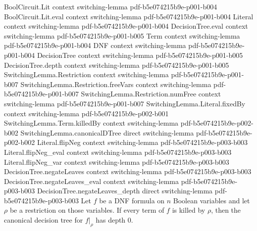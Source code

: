 \begin{lemma}
\label{SwitchingLemma.canonicalDTree_depth_zero_of_killed}
\leanok
{}
\proofstep
  {BoolCircuit.Lit}
  {context}
  {switching-lemma}
  {pdf-b5e074215b9e-p001-b004}
\proofstep
  {BoolCircuit.Lit.eval}
  {context}
  {switching-lemma}
  {pdf-b5e074215b9e-p001-b004}
\proofstep
  {Literal}
  {context}
  {switching-lemma}
  {pdf-b5e074215b9e-p001-b004}
\proofstep
  {DecisionTree.eval}
  {context}
  {switching-lemma}
  {pdf-b5e074215b9e-p001-b005}
\proofstep
  {Term}
  {context}
  {switching-lemma}
  {pdf-b5e074215b9e-p001-b004}
\proofstep
  {DNF}
  {context}
  {switching-lemma}
  {pdf-b5e074215b9e-p001-b004}
\proofstep
  {DecisionTree}
  {context}
  {switching-lemma}
  {pdf-b5e074215b9e-p001-b005}
\proofstep
  {DecisionTree.depth}
  {context}
  {switching-lemma}
  {pdf-b5e074215b9e-p001-b005}
\proofstep
  {SwitchingLemma.Restriction}
  {context}
  {switching-lemma}
  {pdf-b5e074215b9e-p001-b007}
\proofstep
  {SwitchingLemma.Restriction.freeVars}
  {context}
  {switching-lemma}
  {pdf-b5e074215b9e-p001-b007}
\proofstep
  {SwitchingLemma.Restriction.numFree}
  {context}
  {switching-lemma}
  {pdf-b5e074215b9e-p001-b007}
\proofstep
  {SwitchingLemma.Literal.fixedBy}
  {context}
  {switching-lemma}
  {pdf-b5e074215b9e-p002-b001}
\proofstep
  {SwitchingLemma.Term.killedBy}
  {context}
  {switching-lemma}
  {pdf-b5e074215b9e-p002-b002}
\proofstep
  {SwitchingLemma.canonicalDTree}
  {direct}
  {switching-lemma}
  {pdf-b5e074215b9e-p002-b002}
\proofstep
  {Literal.flipNeg}
  {context}
  {switching-lemma}
  {pdf-b5e074215b9e-p003-b003}
\proofstep
  {Literal.flipNeg_eval}
  {context}
  {switching-lemma}
  {pdf-b5e074215b9e-p003-b003}
\proofstep
  {Literal.flipNeg_var}
  {context}
  {switching-lemma}
  {pdf-b5e074215b9e-p003-b003}
\proofstep
  {DecisionTree.negateLeaves}
  {context}
  {switching-lemma}
  {pdf-b5e074215b9e-p003-b003}
\proofstep
  {DecisionTree.negateLeaves_eval}
  {context}
  {switching-lemma}
  {pdf-b5e074215b9e-p003-b003}
\proofstep
  {DecisionTree.negateLeaves_depth}
  {direct}
  {switching-lemma}
  {pdf-b5e074215b9e-p003-b003}
Let $f$ be a DNF formula on $n$ Boolean variables and let $\rho$ be a restriction on
those variables. If every term of $f$ is killed by $\rho$, then the canonical decision
tree for $f|_\rho$ has depth $0$.
\end{lemma}

